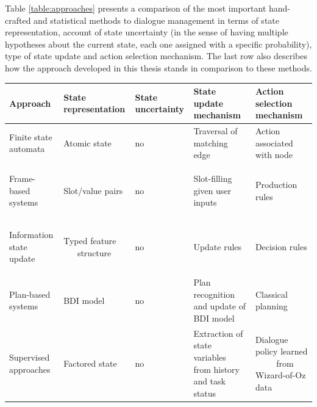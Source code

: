 Table \ref{table:approaches} presents a comparison of the most important hand-crafted and statistical methods to dialogue management in terms of state representation, account of state uncertainty (in the sense of having multiple hypotheses about the current state, each one assigned with a specific probability), type of state update and action selection mechanism.  The last row also describes how the approach developed in this thesis stands in comparison to these methods. 
  
\renewcommand{\arraystretch}{2.0}
\setlength{\tabcolsep}{8pt}
\begin{table}
\begin{center}
\begin{tabular}{|p{55mm}||p{29mm}|p{16mm}|p{50mm}|p{52mm}|} \hline
\centering \textbf{Approach} &  \centering \textbf{State representation} &  \centering \textbf{State uncertainty} &  \centering \textbf{State update mechanism} & \textbf{Action selection mechanism} \vspace{5pt} \\  \hline \hline
Finite state automata & Atomic state & no & Traversal of matching edge & Action associated with node \vspace{5pt} \\ \hline
Frame-based systems \; \; \; \; \; \; \; \; \; \; \; \; \begin{footnotesize}\citep[e.g.][]{seneff2000}\end{footnotesize}& Slot/value pairs & no & Slot-filling given user inputs & Production rules \vspace{5pt} \\ \hline
Information state update \; \; \; \; \; \; \begin{footnotesize}\citep[e.g.][]{Larsson:2000}\end{footnotesize} & Typed feature $\phantom{bbb}$ structure \vspace{5pt} & no & Update rules & Decision rules \vspace{5pt} \\ \hline
Plan-based systems   \; \;  \; \; \; \; \; \; \; \; \begin{footnotesize}\citep[e.g.][]{Freedman:2000,Allen:2000:AGD:973935.973937}\end{footnotesize} & BDI model \vspace{5pt} & no & Plan recognition and update of BDI model & Classical planning \vspace{5pt} \\ \hline
Supervised approaches \; \; \; \; \; \; \; \; \begin{footnotesize}\citep[e.g.][]{Hurtado:2005}\end{footnotesize} & Factored state & no & Extraction of state variables $\phantom{aa}$ from history and task status & Dialogue policy learned $\phantom{aaaa}$ from Wizard-of-Oz data \vspace{5pt} \\ \hline

\end{tabular}
\end{center}
\end{table}
